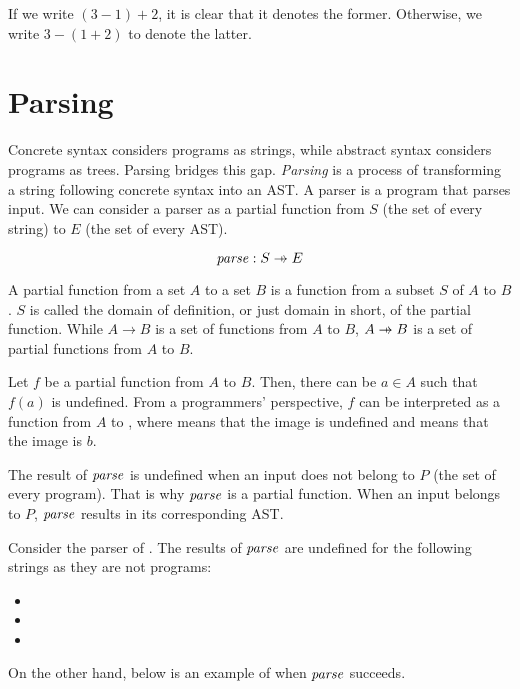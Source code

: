 If we write $(3-1)+2$, it is clear that it denotes the former. Otherwise, we
write $3-(1+2)$ to denote the latter.

\section{Parsing}

Concrete syntax considers programs as strings, while abstract syntax considers
programs as trees. Parsing bridges this gap. \textit{Parsing} is
a process of transforming a string following concrete syntax into an AST. A
parser is a program that parses input. We can consider a parser as a partial
function from $S$ (the set of every string) to $E$ (the set of
every AST).

\[\embox{parse}: S\pto E\]

\begin{kaobox}[frametitle=Partial functions]
  A partial function from a set $A$ to a set $B$ is a function from a subset $S$ of
  $A$ to $B$. $S$ is called the domain of definition, or just domain in short, of the partial function.
  While $A\rightarrow B$ is a set of functions from $A$ to $B$, $A\pto B$ is a set
  of partial functions from $A$ to $B$.

  Let $f$ be a partial function from $A$ to $B$. Then, there can be $a\in A$ such
  that $f(a)$ is undefined. From a programmers' perspective, $f$ can be
  interpreted as a function from $A$ to , where 
  means that the image is undefined and  means that the image is
  $b$.
\end{kaobox}

The result of $\mbox{\emph{parse}}$
is undefined when an input does not belong to $P$ (the set of every
program). That is why $\mbox{\emph{parse}}$ is a partial function. When an input
belongs to $P$, $\mbox{\emph{parse}}$ results in its corresponding AST.

Consider the parser of \Lang. The results of $\mbox{\emph{parse}}$ are undefined for
the following strings as they are not \Lang programs:

\begin{itemize}
  \item {}
  \item {}
  \item {}
\end{itemize}

On the other hand, below is an example of when $\mbox{\emph{parse}}$ succeeds.

